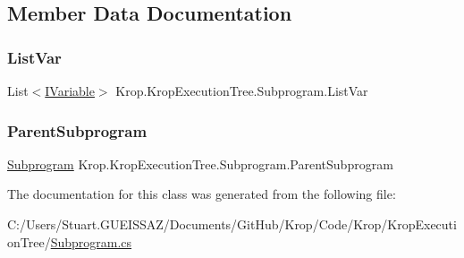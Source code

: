 \subsection{Member Data Documentation}
\mbox{\label{class_krop_1_1_krop_execution_tree_1_1_subprogram_a22b8af148b8bf0bef634a3efb1290a94}} 
\subsubsection{\texorpdfstring{List\+Var}{ListVar}}
{\footnotesize\ttfamily List$<$\mbox{\hyperlink{interface_krop_1_1_krop_execution_tree_1_1_interface_1_1_i_variable}{I\+Variable}}$>$ Krop.\+Krop\+Execution\+Tree.\+Subprogram.\+List\+Var}

\mbox{\label{class_krop_1_1_krop_execution_tree_1_1_subprogram_a8c7a1466aa0fa810acf3608419dae5d7}} 
\subsubsection{\texorpdfstring{Parent\+Subprogram}{ParentSubprogram}}
{\footnotesize\ttfamily \mbox{\hyperlink{class_krop_1_1_krop_execution_tree_1_1_subprogram}{Subprogram}} Krop.\+Krop\+Execution\+Tree.\+Subprogram.\+Parent\+Subprogram}



The documentation for this class was generated from the following file\+:\begin{DoxyCompactItemize}
\item 
C\+:/\+Users/\+Stuart.\+G\+U\+E\+I\+S\+S\+A\+Z/\+Documents/\+Git\+Hub/\+Krop/\+Code/\+Krop/\+Krop\+Execution\+Tree/\mbox{\hyperlink{_subprogram_8cs}{Subprogram.\+cs}}\end{DoxyCompactItemize}
